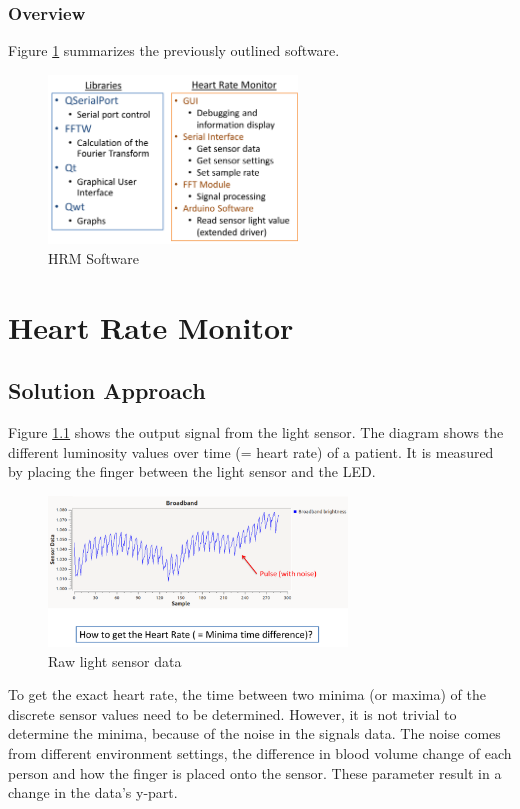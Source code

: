 \documentclass[notitlepage]{scrreprt}
\begin{document}
\subsection{Overview}
Figure \ref{fig:software} summarizes the previously outlined software.

\begin{figure}[H]
	\centering
	\includegraphics[width=250px]{images/software.png}
	\caption{HRM Software}
	\label{fig:software}
\end{figure}

\chapter{Heart Rate Monitor}
\label{chap:hrm}
\section{Solution Approach}
Figure \ref{fig:raw-data} shows the output signal from the light sensor. The diagram shows the different luminosity values over time (= heart rate) of a patient. It is measured by placing the finger between the light sensor and the LED.

\begin{figure}[H]
	\centering
	\includegraphics[width=300px]{images/rawData.png}
	\caption{Raw light sensor data}
	\label{fig:raw-data}
\end{figure}

To get the exact heart rate, the time between two minima (or maxima) of the discrete sensor values need to be determined. However, it is not trivial to determine the minima, because of the noise in the signals data. The noise comes from different environment settings, the difference in blood volume change of each person and how the finger is placed onto the sensor. These parameter result in a change in the data's y-part.
\end{document}
